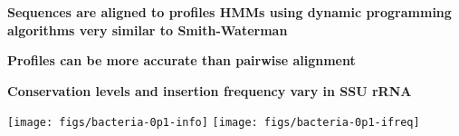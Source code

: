 \documentclass[landscape]{slides}
\begin{document}
\begin{slide}
\begin{center}
\textbf{Sequences are aligned to profiles HMMs using dynamic
  programming algorithms very similar to Smith-Waterman}
\end{center}


\vfill
\end{slide}
\begin{slide}
\begin{center}
\textbf{Profiles can be more accurate than pairwise alignment}
\end{center}


\vfill
\end{slide}
\begin{slide}
\begin{center}
\textbf{Conservation levels and insertion frequency vary in SSU rRNA}
\end{center}

\begin{center}
\texttt{[image: figs/bacteria-0p1-info]}
\texttt{[image: figs/bacteria-0p1-ifreq]}
\end{center}

\vfill
\end{slide}
\end{document}
